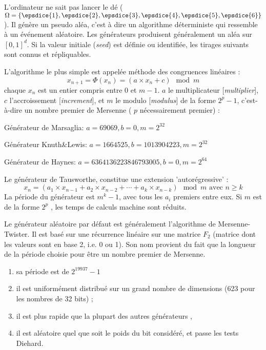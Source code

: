 \begin{f}
L'ordinateur ne sait pas lancer le dé (\(\Omega=\{ \epsdice{1}, \epsdice{2}, \epsdice{3}, \epsdice{4}, \epsdice{5}, \epsdice{6} \}\)).
Il génère un pseudo aléa, c'est à dire un algorithme déterministe qui ressemble à un événement aléatoire.
Les générateurs produisent généralement un aléa sur \([0,1]^d\).
Si la valeur initiale (\emph{seed}) est définie ou identifiée, les tirages suivants sont connus et répliquables.


L'algorithme le plus simple est  appelée méthode des congruences linéaires :
\[
x_{n+1}=\Phi(x_n)= (a\times x_n+c) \mod m
\] \small
chaque \(x_n\) est un entier compris entre 0 et \(m-1\).
\(a\) le multiplicateur [\emph{multiplier}], \(c\) l'accroissement [\emph{increment}], et \(m\) le modulo [\emph{modulus}] de la forme \(2^p-1\), c'est-à-dire un nombre premier de Mersenne ( \( p \) nécessairement premier) :

Générateur de Marsaglia: \(a=69069, b=0, m=2^{32}\)

Générateur Knuth\&Lewis: \(a=1664525, b=1013904223, m=2^{32}\)

Générateur de Haynes: \(a=6364136223846793005, b=0, m=2^{64}\)

Le générateur de Tausworthe, constitue une extension 'autorégressive' :
\[
x_{n}=(a_{1}\times x_{n-1}+a_{2}\times x_{n-2}+\cdots +a_{k}\times x_{n-k}) \mod m \text{ avec } n\geq k
\]
La période du générateur est \(m^k-1\), avec tous les \(a_i\) premiers entre eux. Si \(m\) est de la forme \(2^p\) , les temps de calculs machine sont réduits. 


Le générateur aléatoire par défaut est généralement l'algorithme de Mersenne-Twister. Il est basé sur une récurrence linéaire sur une matrice \(F_{2}\) (matrice dont les valeurs sont en base 2, i.e. 0 ou 1). 
Son nom provient du fait que la longueur de la période choisie pour être un nombre premier de Mersenne. 
\begin{enumerate}
	\item     sa période est de \(2^{19937}-1 \)
	\item     il est uniformément distribué sur un grand nombre de dimensions (623 pour les nombres de 32 bits) ;
	\item     il est plus rapide que la plupart des autres générateurs ,
	\item     il est aléatoire quel que soit le poids du bit considéré, et passe les tests Diehard.
\end{enumerate}
\end{f}
%

